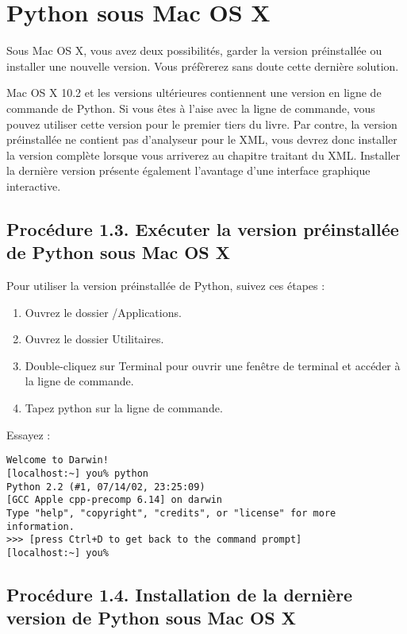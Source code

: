 \section{Python sous Mac OS X}\label{Python sous Mac OS X}

Sous Mac OS X, vous avez deux possibilités, garder la version préinstallée ou installer une nouvelle version. Vous préfèrerez sans doute cette dernière solution.

\medskip
Mac OS X 10.2 et les versions ultérieures contiennent une version en ligne de commande de Python. Si vous êtes à l'aise avec la ligne de commande, vous pouvez utiliser cette version pour le premier tiers du livre. Par contre, la version préinstallée ne contient pas d'analyseur pour le XML, vous devrez donc installer la version complète lorsque vous arriverez au chapitre traitant du XML. Installer la dernière version présente également l'avantage d'une interface graphique interactive.

\subsection*{Procédure 1.3. Exécuter la version préinstallée de Python sous Mac OS X}

Pour utiliser la version préinstallée de Python, suivez ces étapes :

\begin {enumerate}
    \item Ouvrez le dossier /Applications.
    \item Ouvrez le dossier Utilitaires.
    \item Double-cliquez sur Terminal pour ouvrir une fenêtre de terminal et accéder à la ligne de commande.
    \item Tapez python sur la ligne de commande.
\end{enumerate}

\medskip
\noindent Essayez :

\begin{lstlisting}[style=none]
Welcome to Darwin!
[localhost:~] you% python
Python 2.2 (#1, 07/14/02, 23:25:09)
[GCC Apple cpp-precomp 6.14] on darwin
Type "help", "copyright", "credits", or "license" for more information.
>>> [press Ctrl+D to get back to the command prompt]
[localhost:~] you%
\end{lstlisting}

\subsection*{Procédure 1.4. Installation de la dernière version de Python sous Mac OS X}


